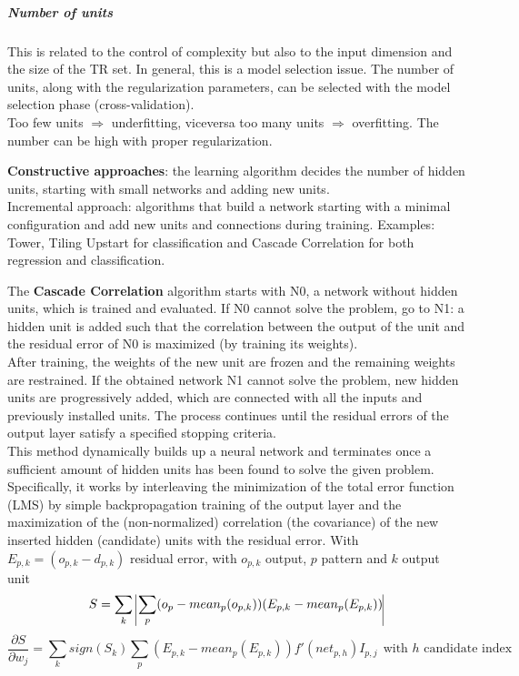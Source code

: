 \documentclass[10pt]{report}
\begin{document}
\subparagraph{Number of units} This is related to the control of complexity but also to the input dimension and the size of the TR set. In general, this is a model selection issue. The number of units, along with the regularization parameters, can be selected with the model selection phase (cross-validation).\\
Too few units $\Rightarrow$ underfitting, viceversa too many units $\Rightarrow$ overfitting. The number can be high with proper regularization.
\begin{list}{}{}
	\item \textbf{Constructive approaches}: the learning algorithm decides the number of hidden units, starting with small networks and adding new units.\\
	Incremental approach: algorithms that build a network starting with a minimal configuration and add new units and connections during training. Examples: Tower, Tiling Upstart for classification and Cascade Correlation for both regression and classification.\begin{list}{}{}
		\item The \textbf{Cascade Correlation} algorithm starts with N0, a network without hidden units, which is trained and evaluated. If N0 cannot solve the problem, go to N1: a hidden unit is added such that the correlation between the output of the unit and the residual error of N0 is maximized (by training its weights).\\
		After training, the weights of the new unit are frozen and the remaining weights are restrained. If the obtained network N1 cannot solve the problem, new hidden units are progressively added, which are connected with all the inputs and previously installed units. The process continues until the residual errors of the output layer satisfy a specified stopping criteria.\\
		This method dynamically builds up a neural network and terminates once a sufficient amount of hidden units has been found to solve the given problem. Specifically, it works by interleaving the minimization of the total error function (LMS) by simple backpropagation training of the output layer and the maximization of the (non-normalized) correlation (the covariance) of the new inserted hidden (candidate) units with the residual error. With $E_{p,k} = (o_{p,k} - d_{p,k})$ residual error, with $o_{p,k}$ output, $p$ pattern and $k$ output unit
		$$S = \sum_k\:\vline\sum_p(o_p - mean_p(o_{p,k}))(E_{p,k} - mean_p(E_{p,k}))\vline$$
		$$\frac{\partial S}{\partial w_j} = \sum_k sign(S_k)\sum_p(E_{p,k} - mean_p(E_{p,k}))f'(net_{p,h})I_{p,j}\:\:\text{with }h\text{ candidate index}$$

\end{list}
\end{list}
\end{document}
